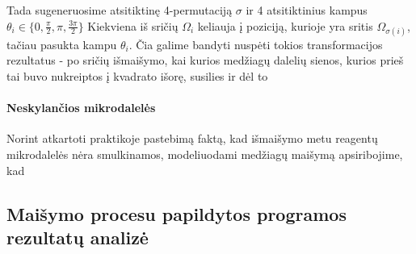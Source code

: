 Tada sugeneruosime atsitiktinę 4-permutaciją $\sigma$ ir 4 atsitiktinius kampus $\theta_i \in \{0, \frac{\pi}{2}, \pi, \frac{3\pi}{2}\}$ Kiekviena iš sričių $\Omega_i$ keliauja į poziciją, kurioje yra sritis $\Omega_{\sigma(i)}$, tačiau pasukta kampu $\theta_i$. Čia galime bandyti nuspėti tokios transformacijos rezultatus - po sričių išmaišymo, kai kurios medžiagų dalelių sienos, kurios prieš tai buvo nukreiptos į kvadrato išorę, susilies ir dėl to 


\paragraph{Neskylančios mikrodalelės}

Norint atkartoti praktikoje pastebimą faktą, kad išmaišymo metu reagentų mikrodalelės nėra smulkinamos, modeliuodami medžiagų maišymą apsiribojime, kad 




\subsection{Maišymo procesu papildytos programos rezultatų analizė}

